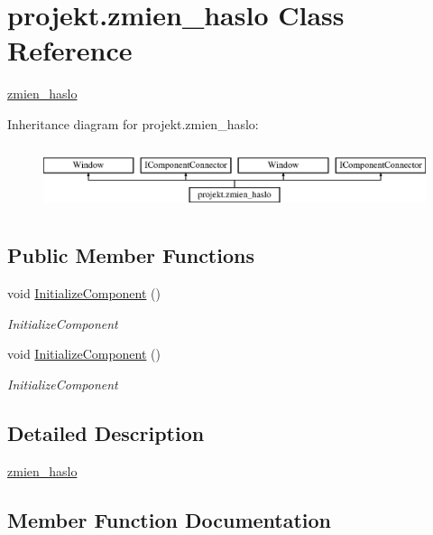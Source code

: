 \hypertarget{classprojekt_1_1zmien__haslo}{}\section{projekt.\+zmien\+\_\+haslo Class Reference}
\label{classprojekt_1_1zmien__haslo}


\mbox{\hyperlink{classprojekt_1_1zmien__haslo}{zmien\+\_\+haslo}}  


Inheritance diagram for projekt.\+zmien\+\_\+haslo\+:\begin{figure}[H]
\begin{center}
\leavevmode
\includegraphics[height=1.931034cm]{classprojekt_1_1zmien__haslo}
\end{center}
\end{figure}
\subsection*{Public Member Functions}
\begin{DoxyCompactItemize}
\item 
void \mbox{\hyperlink{classprojekt_1_1zmien__haslo_a64564a406e807cedb10ae430ccf00577}{Initialize\+Component}} ()
\begin{DoxyCompactList}\small\item\em Initialize\+Component \end{DoxyCompactList}\item 
void \mbox{\hyperlink{classprojekt_1_1zmien__haslo_a64564a406e807cedb10ae430ccf00577}{Initialize\+Component}} ()
\begin{DoxyCompactList}\small\item\em Initialize\+Component \end{DoxyCompactList}\end{DoxyCompactItemize}


\subsection{Detailed Description}
\mbox{\hyperlink{classprojekt_1_1zmien__haslo}{zmien\+\_\+haslo}} 



\subsection{Member Function Documentation}
\mbox{\label{classprojekt_1_1zmien__haslo_a64564a406e807cedb10ae430ccf00577}} 
